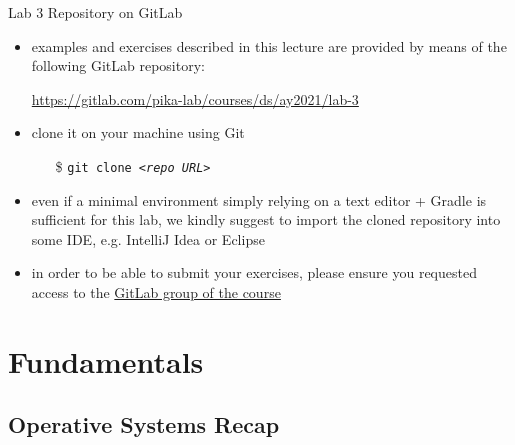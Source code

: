 \documentclass{beamer}\mode<presentation>{\usetheme{AMSBolognaFC}}
\newcommand{\labN}{3}
\newcommand{\labGroup}{https://gitlab.com/pika-lab/courses/ds/ay2021}
\newcommand{\labRepo}{\labGroup/lab-\labN}
\begin{document}
\begin{frame}[c]{Lab \labN{} Repository on GitLab}

	\begin{itemize}
		\item examples and exercises described in this lecture are provided by means of the following GitLab repository:
		\begin{center}
			\url{\labRepo}
		\end{center}

		\vfill

		\item clone it on your machine using Git
		\begin{itemize}
		    \item[\$] \texttt{git clone \textit{<repo URL>}}
		\end{itemize}

		\vfill

		\item even if a minimal environment simply relying on a text editor + Gradle is sufficient for this lab, we kindly suggest to import the cloned repository into some IDE, e.g. IntelliJ Idea or Eclipse

		\vfill

		\item in order to be able to submit your exercises, please ensure you requested access to the \href{\labGroup}{GitLab group of the course}
	\end{itemize}

\end{frame}

\section{Fundamentals}

\subsection{Operative Systems Recap}
\end{document}
